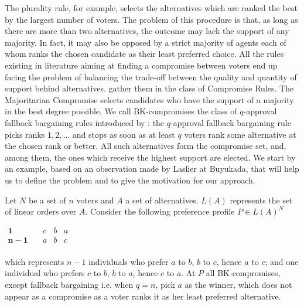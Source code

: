 \documentclass[version=3.21, pagesize, notitlepage, twoside=off, bibliography=totoc, DIV=calc, fontsize=12pt, a4paper]{scrartcl}
\begin{document}
The plurality rule, for example, selects the alternatives which are ranked the best by the largest number of voters. The problem of this procedure is that, as long as there are more than two alternatives, the outcome may lack the support of any majority. In fact, it may also be opposed by a strict majority of agents each of whom ranks the chosen candidate as their least preferred choice. All the rules existing in literature aiming at finding a compromise between voters end up facing the problem of balancing the trade-off between the quality and quantity of support behind alternatives. \citet{Merlin2019} gather them in the class of Compromise Rules. The Majoritarian Compromise \citep{Sertel1999} selects candidates who have the support of a majority in the best degree possible. 
We call BK-compromises the class of $q$-approval fallback bargaining rules introduced by \citet{Brams2001}: the $q$-approval fallback bargaining rule picks ranks $1, 2, \dots$ and stops as soon as at least $q$ voters rank some alternative at the chosen rank or better. All such alternatives form the compromise set, and, among them, the ones which receive the highest support are elected.
We start by an example, based on an observation made by Laslier at Buyukada, that will help us to define the problem and to give the motivation for our approach.


\begin{example}
	\label{ex:ex1}
	Let $N$ be a set of $n$ voters and $A$ a set of alternatives. $L(A)$ represents the set of linear orders over $A$. Consider the following preference profile $P\in L(A)^{N}$
	\begin{center}
		$
		\begin{array}{cccc}
		\mathbf{1} \quad &c&b&a\\
		\mathbf{n-1} \quad &a&b&c\\
		\end{array}
		$
	\end{center}
	which represents $n-1$ individuals who prefer $a$ to $b$, $b$ to $c$, hence $a$ to $c$; and one individual who prefers $c$ to $b$, $b$ to $a$, hence $c$ to $a $. At $P$ all BK-compromises, except fallback bargaining i.e. when $q=n$, pick $a$ as the winner, which does not appear as a compromise as a voter ranks it as her least preferred alternative.
\end{example}
\end{document}
